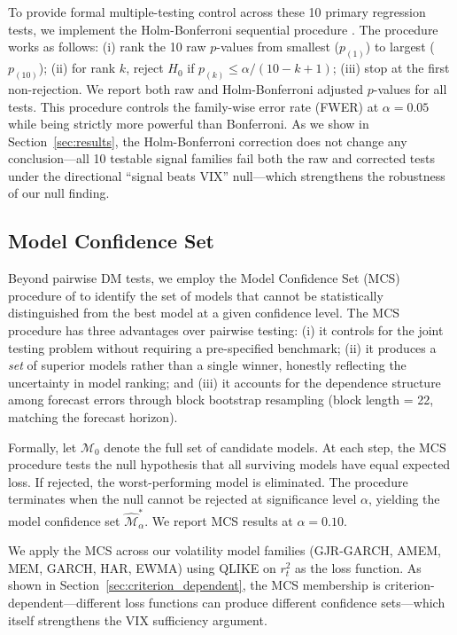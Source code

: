 \documentclass[12pt,a4paper]{article}
\begin{document}
To provide formal multiple-testing control across these 10 primary regression tests, we implement the Holm-Bonferroni sequential procedure \citep{holm1979}. The procedure works as follows: (i) rank the 10 raw $p$-values from smallest ($p_{(1)}$) to largest ($p_{(10)}$); (ii) for rank $k$, reject $H_0$ if $p_{(k)} \leq \alpha / (10 - k + 1)$; (iii) stop at the first non-rejection. We report both raw and Holm-Bonferroni adjusted $p$-values for all tests. This procedure controls the family-wise error rate (FWER) at $\alpha = 0.05$ while being strictly more powerful than Bonferroni. As we show in Section~\ref{sec:results}, the Holm-Bonferroni correction does not change any conclusion---all 10 testable signal families fail both the raw and corrected tests under the directional ``signal beats VIX'' null---which strengthens the robustness of our null finding.

\subsection{Model Confidence Set}
\label{sec:mcs}

Beyond pairwise DM tests, we employ the Model Confidence Set (MCS) procedure of \citet{hansen2011mcs} to identify the set of models that cannot be statistically distinguished from the best model at a given confidence level. The MCS procedure has three advantages over pairwise testing: (i) it controls for the joint testing problem without requiring a pre-specified benchmark; (ii) it produces a \emph{set} of superior models rather than a single winner, honestly reflecting the uncertainty in model ranking; and (iii) it accounts for the dependence structure among forecast errors through block bootstrap resampling (block length = 22, matching the forecast horizon).

Formally, let $\mathcal{M}_0$ denote the full set of candidate models. At each step, the MCS procedure tests the null hypothesis that all surviving models have equal expected loss. If rejected, the worst-performing model is eliminated. The procedure terminates when the null cannot be rejected at significance level $\alpha$, yielding the model confidence set $\hat{\mathcal{M}}^*_\alpha$. We report MCS results at $\alpha = 0.10$.

We apply the MCS across our volatility model families (GJR-GARCH, AMEM, MEM, GARCH, HAR, EWMA) using QLIKE on $r_t^2$ as the loss function. As shown in Section~\ref{sec:criterion_dependent}, the MCS membership is criterion-dependent---different loss functions can produce different confidence sets---which itself strengthens the VIX sufficiency argument.
\end{document}
